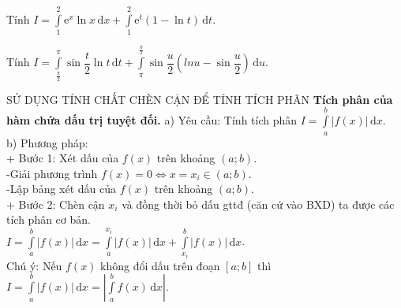 \begin{ex}%
	Tính $I=\displaystyle\int\limits_1^2\mathrm{e}^x\ln x\mathrm{\,d}x+\displaystyle\int\limits_1^2\mathrm{e}^t(1-\ln t)\mathrm{\,d}t$.
\end{ex}
\begin{ex}%
	Tính $I=\displaystyle\int\limits_{\tfrac{\pi}{2}}^{\pi}\sin\dfrac{t}{2}\ln t\mathrm{\,d}t+\displaystyle\int\limits_{\pi}^{\tfrac{\pi}{2}}\sin\dfrac{u}{2}\left(ln u-\sin\dfrac{u}{2}\right)\mathrm{\,d}u$.
\end{ex}
\begin{dang}{SỬ DỤNG TÍNH CHẤT CHÈN CẬN ĐỂ TÍNH TÍCH PHÂN}
\textbf{Tích phân của hàm chứa dấu trị tuyệt đối.}
	a) Yêu cầu: Tính tích phân $I=\displaystyle\int\limits_a^b|f(x)|\mathrm{\,d}x$.\\
	b) Phương pháp:\\
	+ Bước 1: Xét dấu của $f(x)$ trên khoảng $(a;b)$.\\
	-Giải phương trình $f(x)=0\Leftrightarrow x=x_i\in(a;b)$.\\
	-Lập bảng xét dấu của $f(x)$ trên khoảng $(a;b)$.\\
	+ Bước 2: Chèn cận $x_i$ và đồng thời bỏ dấu gttđ (căn cứ vào BXD) ta được các tích phân cơ bản.\\
	$I=\displaystyle\int\limits_a^b\left|f(x)\right|\mathrm{\,d}x=\displaystyle\int\limits_a^{x_i}\left|f(x)\right|\mathrm{\,d}x+\displaystyle\int\limits_{x_i}^b\left|f(x)\right|\mathrm{\,d}x$.\\
	Chú ý: Nếu $f(x)$ không đổi dấu trên đoạn $[a;b]$ thì $I=\displaystyle\int\limits_a^b\left|f(x)\right|\mathrm{\,d}x=\left|\displaystyle\int\limits_a^b f(x)\mathrm{\,d}x\right|$.
\end{dang}
